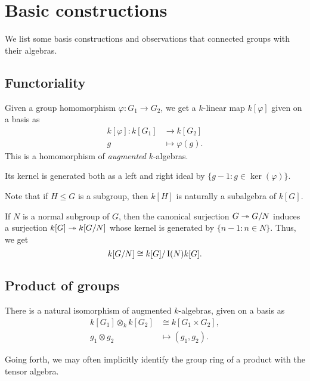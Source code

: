 \documentclass[12pt]{article}
\begin{document}
\section{Basic constructions}

We list some basis constructions and observations that connected groups with their algebras.

\subsection{Functoriality}

Given a group homomorphism $\varphi \colon G_{1} \to G_{2}$, 
we get a $k$-linear map $k[\varphi]$ given on a basis as
\begin{align*} 
	k[\varphi] \colon k[G_{1}] & \to k[G_{2}] \\
	g & \mapsto \varphi(g).
\end{align*}
This is a homomorphism of \emph{augmented} $k$-algebras.

\begin{lem}
	Its kernel is generated both as a left and right ideal by $\{g - 1 : g \in \ker(\varphi)\}$.
\end{lem}

Note that if $H \le G$ is a subgroup, then $k[H]$ is naturally a subalgebra of $k[G]$.

\begin{thm}
	If $N$ is a normal subgroup of $G$, then the canonical surjection $G \twoheadrightarrow G/N$ induces
	a surjection $k[G] \twoheadrightarrow k[G/N]$ whose kernel is generated by $\{n - 1 : n \in N\}$. 
	Thus, we get
	\begin{equation*} 
		k[G/N] \cong k[G]/\operatorname{I}(N)k[G].
	\end{equation*}
\end{thm}

\subsection{Product of groups}

There is a natural isomorphism of augmented $k$-algebras, given on a basis as
\begin{align*} 
	k[G_{1}] \otimes_{k} k[G_{2}] &\cong k[G_{1} \times G_{2}], \\
	g_{1} \otimes g_{2} &\mapsto (g_{1}, g_{2}).
\end{align*}

Going forth, we may often implicitly identify the group ring of a product with the tensor algebra.
\end{document}
